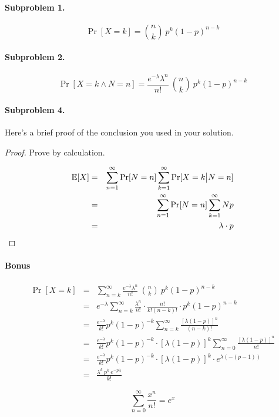 \documentclass[a4paper, 12pt, titlepage]{article}
\begin{document}
\setlength{\parindent}{2em}



\paragraph{Subproblem 1.} \quad\par
\[ \Pr[X=k] = \binom{n}{k}~p^k (1-p)^{n-k} \]

\paragraph{Subproblem 2.} \quad\par
\[ \Pr[X=k \wedge N=n] = \frac{e^{-\lambda}\lambda^n}{n!}~\binom{n}{k} ~p^k (1-p)^{n-k} \]

\paragraph{Subproblem 4.} \quad\par
Here's a brief proof of the conclusion you used in your solution.

\begin{proof}
Prove by calculation.

\begin{eqnarray*}
	\mathbb{E}[X] & = & \sum_{n=1}^{\infty} \Pr[N=n] \sum_{k=1}^{\infty} \Pr[X=k\big|N=n]\\
	& = & \sum_{n=1}^{\infty} \Pr[N=n] \sum_{k=1}^{\infty} N p\\
	& = & \lambda \cdot p
\end{eqnarray*}

\end{proof}

\paragraph{Bonus} \quad\par
\begin{eqnarray*}
	\Pr[X=k] & = & \sum_{n=k}^{\infty} \frac{e^{-\lambda}\lambda^n}{n!}~\binom{n}{k} ~p^k (1-p)^{n-k}\\
	& = & e^{-\lambda} \sum_{n=k}^{\infty} \frac{\lambda^n}{n!} \cdot \frac{n!}{k!(n-k)!} \cdot p^k (1-p)^{n-k}\\
	& = & \frac{e^{-\lambda}}{k!} p^k (1-p)^{-k} \sum_{n=k}^{\infty} \frac{[\lambda(1-p) ]^n}{(n-k)!}\\
	& = & \frac{e^{-\lambda}}{k!} p^k (1-p)^{-k} \cdot [\lambda(1-p) ]^k \sum_{n=0}^{\infty} \frac{[\lambda(1-p) ]^n}{n!}\\
	& = & \frac{e^{-\lambda}}{k!} p^k (1-p)^{-k} \cdot [\lambda(1-p) ]^k \cdot e^{\lambda (-(p-1))}\\
	& = & \frac{\lambda ^k~p^k~e^{-p\lambda}}{k!}
\end{eqnarray*}

\[ \sum_{n=0}^\infty \frac{x^n}{n!} = e^x\]
\end{document}
